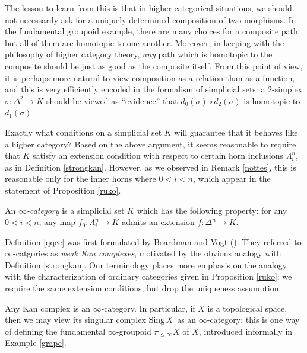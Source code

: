 The lesson to learn from this is that in higher-categorical
situations, we should not necessarily ask for a uniquely
determined composition of two morphisms. In the fundamental groupoid
example, there are many choices for a composite path but all of
them are homotopic to one another. Moreover, in keeping with the
philosophy of higher category theory, {\em any} path which is
homotopic to the composite should be just as good as the
composite itself. From this point of view, it is perhaps more natural to
view composition as a relation than as a function, and this is
very efficiently encoded in the formalism of simplicial sets: a
$2$-simplex $\sigma: \Delta^2 \rightarrow K$ should be viewed as
``evidence'' that $d_0(\sigma) \circ d_2(\sigma)$ is homotopic to $d_1(\sigma)$.

Exactly what conditions on a simplicial set $K$ will guarantee that it behaves like a higher category? Based on the above argument, it seems reasonable to require that $K$ satisfy an extension condition with respect to certain horn inclusions $\Lambda^n_i$, as in Definition \ref{strongkan}. However, as we observed in Remark \ref{nottes}, this is reasonable only for the inner horns where $0 < i < n$, which appear in the statement of Proposition \ref{ruko}. 

\begin{definition}\label{qqcc}
An {\it $\infty$-category} is a simplicial set $K$ which has the
following property: for any $0 < i < n$, any map $f_0: \Lambda^n_i
\rightarrow K$ admits an extension $f: \Delta^n \rightarrow K$.
\end{definition}

Definition \ref{qqcc} was first formulated by Boardman and Vogt (\cite{quasicat}). They referred to $\infty$-catgories as {\it weak
Kan complexes}, motivated by the obvious analogy with Definition \ref{strongkan}. Our terminology places more emphasis on the analogy with the characterization of ordinary categories given in Proposition \ref{ruko}: we require the same extension conditions, but drop the uniqueness assumption.

\begin{example}
Any Kan complex is an $\infty$-category. In particular, if $X$ is a topological space, then we may view its singular complex $\operatorname{Sing} X$ as an $\infty$-category: this is one way of defining the fundamental $\infty$-groupoid $\pi_{\leq \infty} X$ of $X$, introduced informally in Example \ref{grape}.
\end{example}

